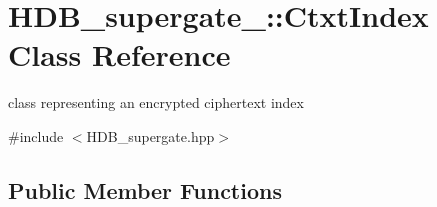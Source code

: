 \hypertarget{classHDB__supergate___1_1CtxtIndex}{}\section{H\+D\+B\+\_\+supergate\+\_\+\+:\+:Ctxt\+Index Class Reference}
\label{classHDB__supergate___1_1CtxtIndex}


class representing an encrypted ciphertext index  




{\ttfamily \#include $<$H\+D\+B\+\_\+supergate.\+hpp$>$}

\subsection*{Public Member Functions}
